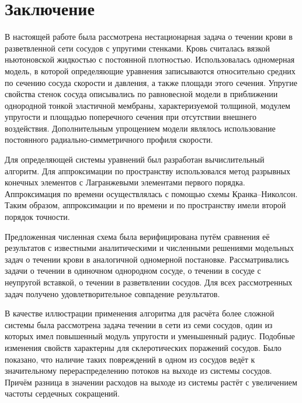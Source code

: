 \section{Заключение}
В настоящей работе была рассмотрена нестационарная задача о течении крови в разветвленной сети сосудов с упругими стенками.
Кровь считалась вязкой ньютоновской жидкостью с постоянной плотностью.
Использовалась одномерная модель, в которой определяющие уравнения записываются относительно
средних по сечению сосуда скорости и давления, а также площади этого сечения.
Упругие свойства стенок сосуда описывались по равновесной модели в приближении однородной тонкой эластичной мембраны,
характеризуемой толщиной, модулем упругости и площадью поперечного сечения при отсутствии внешнего воздействия.
Дополнительным упрощением модели являлось использование постоянного радиально-симметричного профиля скорости.

Для определяющей системы уравнений был разработан вычислительный алгоритм. Для аппроксимации по пространству
использовался метод разрывных конечных элементов с Лагранжевыми элементами первого порядка.
Аппроксимация по времени осуществлялась с помощью схемы Кранка--Николсон.
Таким образом, аппроксимации и по времени и по пространству имели второй порядок точности.

Предложенная численная схема была верифицирована путём сравнения её результатов с известными
аналитическими и численными решениями модельных задач о течении крови в аналогичной одномерной постановке.
Рассматривались задачи о течении в одиночном однородном сосуде, о течении в сосуде с неупругой вставкой,
о течении в разветвлении сосудов.
Для всех рассмотренных задач получено удовлетворительное совпадение результатов.

В качестве иллюстрации применения алгоритма для расчёта более сложной системы
была рассмотрена задача течении в сети из семи сосудов,
один из которых имел повышенный модуль упругости и уменьшенный
радиус. Подобные изменения свойств характерны для склеротических поражений сосудов.
Было показано, что наличие таких повреждений в одном из сосудов
ведёт к значительному перераспределению
потоков на выходе из системы сосудов.
Причём разница в значении расходов на выходе из системы
растёт с увеличением частоты сердечных сокращений.
